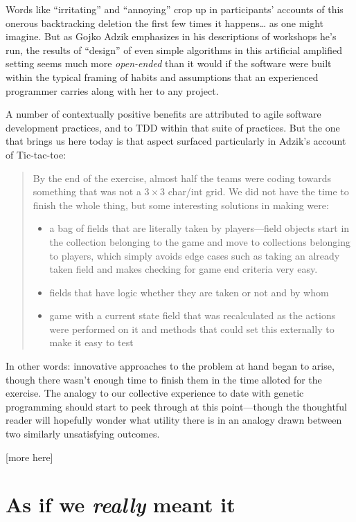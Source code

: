 Words like ``irritating'' and ``annoying'' crop up in participants' accounts of  this onerous backtracking deletion the first few times it happens\ldots{} as one might imagine. But as Gojko Adzik emphasizes in his descriptions of workshops he's run, the results of ``design'' of even simple algorithms in this artificial amplified setting seems much more \emph{open-ended} than it would if the software were built within the typical framing of habits and assumptions that an experienced programmer carries along with her to any project.

A number of contextually positive benefits are attributed to agile software development practices, and to TDD within that suite of practices. But the one that brings us here today is that aspect surfaced particularly in Adzik's account of Tic-tac-toe:

\begin{quotation}
By the end of the exercise, almost half the teams were coding towards something that was not a $3\times 3$ char/int grid. We did not have the time to finish the whole thing, but some interesting solutions in making were:

\begin{itemize}
\item a bag of fields that are literally taken by players---field objects start in the collection belonging to the game and move to collections belonging to players, which simply avoids edge cases such as taking an already taken field and makes checking for game end criteria very easy.
\item fields that have logic whether they are taken or not and by whom
\item game with a current state field that was recalculated as the actions were performed on it and methods that could set this externally to make it easy to test
\end{itemize}
\end{quotation}

In other words: innovative approaches to the problem at hand began to arise, though there wasn't enough time to finish them in the time alloted for the exercise. The analogy to our collective experience to date with genetic programming should start to peek through at this point---though the thoughtful reader will hopefully wonder what utility there is in an analogy drawn between two similarly unsatisfying outcomes.

[more here]

\section{As if we \emph{really} meant it}\hypertarget{as-if-we-really-meant-it}{}\label{as-if-we-really-meant-it}

